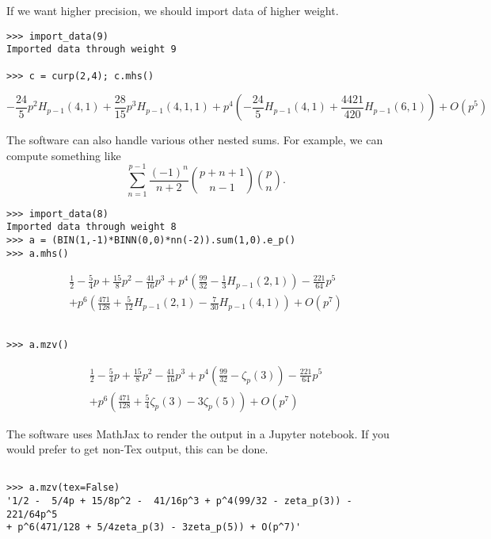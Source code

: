 \documentclass[12pt]{amsart}
\theoremstyle{plain}
\theoremstyle{definition}
\theoremstyle{remark}
\begin{document}
\noindent If we want higher precision, we should import data of higher weight.
\begin{verbatim}
>>> import_data(9)
Imported data through weight 9

>>> c = curp(2,4); c.mhs()
\end{verbatim}
\[
- \frac{24}{5}p^{2}H_{p-1}(4, 1) + \frac{28}{15}p^{3}H_{p-1}(4, 1, 1) + p^{4}\left(- \frac{24}{5}H_{p-1}(4, 1) + \frac{4421}{420}H_{p-1}(6, 1)\right) + O(p^{5})
\]
\smallskip

The software can also handle various other nested sums. For example, we can compute something like
\[
\sum_{n=1}^{p-1}\frac{(-1)^n}{n+2}{p+n+1\choose n-1}{p\choose n}.
\]

\begin{verbatim}
>>> import_data(8)
Imported data through weight 8
>>> a = (BIN(1,-1)*BINN(0,0)*nn(-2)).sum(1,0).e_p()
>>> a.mhs()
\end{verbatim}

\begin{gather*}
\frac{1}{2} -  \frac{5}{4}p + \frac{15}{8}p^{2} -  \frac{41}{16}p^{3} + p^{4}\left(\frac{99}{32} -  \frac{1}{3}H_{p-1}(2, 1)\right) -  \frac{221}{64}p^{5} \\
+ p^{6}\left(\frac{471}{128} + \frac{5}{12}H_{p-1}(2, 1) -  \frac{7}{30}H_{p-1}(4, 1)\right) + O(p^{7})
\end{gather*}

\begin{verbatim}

>>> a.mzv()
\end{verbatim}
\begin{gather*}
\frac{1}{2} -  \frac{5}{4}p + \frac{15}{8}p^{2} -  \frac{41}{16}p^{3} + p^{4}\left(\frac{99}{32} - \zeta_p(3)\right) -  \frac{221}{64}p^{5} \\
+ p^{6}\left(\frac{471}{128} + \frac{5}{4}\zeta_p(3) - 3\zeta_p(5)\right) + O(p^{7})
\end{gather*}
\smallskip

The software uses MathJax to render the output in a Jupyter notebook. If you would prefer to get non-Tex output, this can be done.
\begin{verbatim}

>>> a.mzv(tex=False)
'1/2 -  5/4p + 15/8p^2 -  41/16p^3 + p^4(99/32 - zeta_p(3)) -  221/64p^5
+ p^6(471/128 + 5/4zeta_p(3) - 3zeta_p(5)) + O(p^7)'
\end{verbatim}



\end{document}
